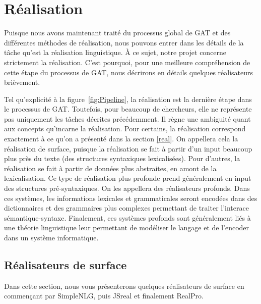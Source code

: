

\section{Réalisation}

Puisque nous avons maintenant traité du processus global de \ac{GAT} et des différentes méthodes de réalisation, nous pouvons entrer dans les détails de la tâche qu'est la réalisation linguistique. À ce sujet, notre projet concerne strictement la réalisation. C'est pourquoi, pour une meilleure compréhension de cette étape du processus de \ac{GAT}, nous décrirons en détails quelques réalisateurs brièvement.

Tel qu'explicité à la figure~\ref{fig:Pipeline}, la réalisation est la dernière étape dans le processus de \ac{GAT}. Toutefois, pour beaucoup de chercheurs, elle ne représente pas uniquement les tâches décrites précédemment. Il règne une ambiguité quant aux concepts qu'incarne la réalisation. Pour certains, la réalisation correspond exactement à ce qu'on a présenté dans la section \ref{real}. On appellera cela la réalisation de surface, puisque la réalisation se fait à partir d'un input beaucoup plus près du texte (des structures syntaxiques lexicalisées). Pour d'autres, la réalisation se fait à partir de données plus abstraites, en amont de la lexicalisation. Ce type de réalisation plus profonde prend généralement en input des structures pré-syntaxiques. On les appellera des réalisateurs profonds. Dans ces systèmes, les informations lexicales et grammaticales seront encodées dans des dictionnaires et des grammaires plus complexes permettant de traiter l'interace sémantique-syntaxe. Finalement, ces systèmes profonds sont généralement liés à une théorie linguistique leur permettant de modéliser le langage et de l'encoder dans un système informatique.


\subsection{Réalisateurs de surface}

Dans cette section, nous vous présenterons quelques réalisateurs de surface en commençant par SimpleNLG, puis JSreal et finalement RealPro.


